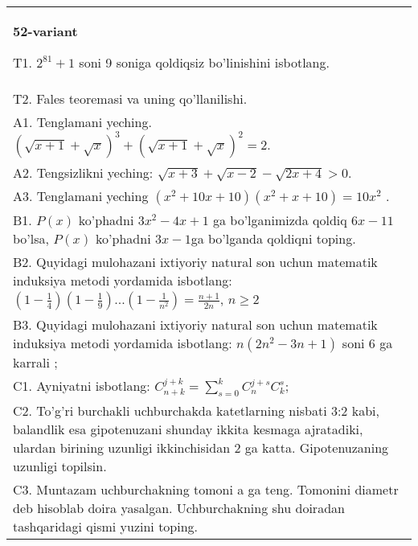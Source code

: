 \documentclass{article}
\begin{document}
\begin{tabular}{m{17cm}}
\textbf{52-variant}
\newline

T1. \(2^{81} + 1\) soni 9 soniga qoldiqsiz bo'linishini isbotlang. \\
T2. Fales teoremasi va uning qo'llanilishi. \\
A1. Tenglamani yeching. \((\sqrt{x + 1} + \sqrt{x})^{3} + (\sqrt{x + 1} + \sqrt{x})^{2} = 2\). \\
A2. Tengsizlikni yeching: \(\sqrt{x + 3} + \sqrt{x - 2} - \sqrt{2x + 4} > 0\). \\
A3. Tenglamani yeching \(\left( x^{2} + 10x + 10 \right)\left( x^{2} + x + 10 \right) = 10x^{2}\) . \\
B1. \(P(x)\) ko'phadni \(3x^{2} - 4x + 1\) ga bo'lganimizda qoldiq \(6x - 11\) bo'lsa, \(P(x)\) ko'phadni \(3x - 1\)ga bo'lganda qoldiqni toping. \\
B2. Quyidagi mulohazani ixtiyoriy natural son uchun matematik induksiya metodi yordamida isbotlang: \(\left( 1 - \frac{1}{4} \right)\left( 1 - \frac{1}{9} \right)...\left( 1 - \frac{1}{n^{2}} \right) = \frac{n + 1}{2n}\), \(n \geq 2\) \\
B3. Quyidagi mulohazani ixtiyoriy natural son uchun matematik induksiya metodi yordamida isbotlang: \(n\left( 2n^{2} - 3n + 1 \right)\) soni 6 ga karrali ; \\
C1. Ayniyatni isbotlang: \(C_{n + k}^{j + k} = \sum_{s = 0}^{k}C_{n}^{j + s}C_{k}^{s}\); \\
C2. To'g'ri burchakli uchburchakda katetlarning nisbati 3:2 kabi, balandlik esa gipotenuzani shunday ikkita kesmaga ajratadiki, ulardan birining uzunligi ikkinchisidan 2 ga katta. Gipotenuzaning uzunligi topilsin. \\
C3. Muntazam uchburchakning tomoni a ga teng. Tomonini diametr deb hisoblab doira yasalgan. Uchburchakning shu doiradan tashqaridagi qismi yuzini toping. \\

\end{tabular}
\vspace{1cm}
\end{document}
